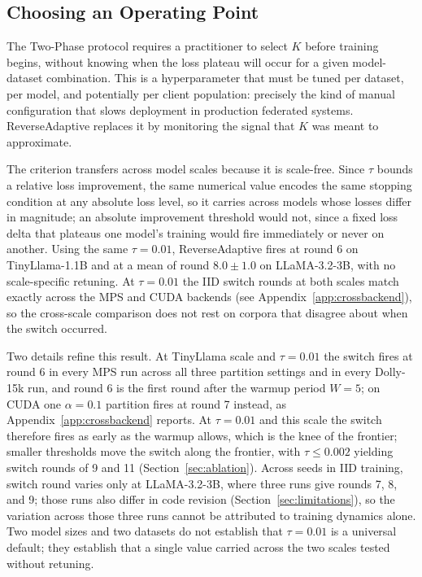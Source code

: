 \documentclass[iicol,pdflatex,sn-mathphys-num]{sn-jnl}
\begin{document}
\subsection{Choosing an Operating Point}
\label{sec:choosing}
The Two-Phase protocol requires a practitioner to select $K$ before training begins, without knowing when the loss plateau will occur for a given model-dataset combination. This is a hyperparameter that must be tuned per dataset, per model, and potentially per client population: precisely the kind of manual configuration that slows deployment in production federated systems. ReverseAdaptive replaces it by monitoring the signal that $K$ was meant to approximate.

The criterion transfers across model scales because it is scale-free. Since $\tau$ bounds a relative loss improvement, the same numerical value encodes the same stopping condition at any absolute loss level, so it carries across models whose losses differ in magnitude; an absolute improvement threshold would not, since a fixed loss delta that plateaus one model's training would fire immediately or never on another. Using the same $\tau{=}0.01$, ReverseAdaptive fires at round 6 on TinyLlama-1.1B and at a mean of round $8.0 \pm 1.0$ on LLaMA-3.2-3B, with no scale-specific retuning. At $\tau{=}0.01$ the IID switch rounds at both scales match exactly across the MPS and CUDA backends (see Appendix~\ref{app:crossbackend}), so the cross-scale comparison does not rest on corpora that disagree about when the switch occurred.

Two details refine this result. At TinyLlama scale and $\tau{=}0.01$ the switch fires at round 6 in every MPS run across all three partition settings and in every Dolly-15k run, and round 6 is the first round after the warmup period $W{=}5$; on CUDA one $\alpha{=}0.1$ partition fires at round 7 instead, as Appendix~\ref{app:crossbackend} reports. At $\tau{=}0.01$ and this scale the switch therefore fires as early as the warmup allows, which is the knee of the frontier; smaller thresholds move the switch along the frontier, with $\tau \leq 0.002$ yielding switch rounds of 9 and 11 (Section~\ref{sec:ablation}). Across seeds in IID training, switch round varies only at LLaMA-3.2-3B, where three runs give rounds 7, 8, and 9; those runs also differ in code revision (Section~\ref{sec:limitations}), so the variation across those three runs cannot be attributed to training dynamics alone. Two model sizes and two datasets do not establish that $\tau{=}0.01$ is a universal default; they establish that a single value carried across the two scales tested without retuning.
\end{document}
